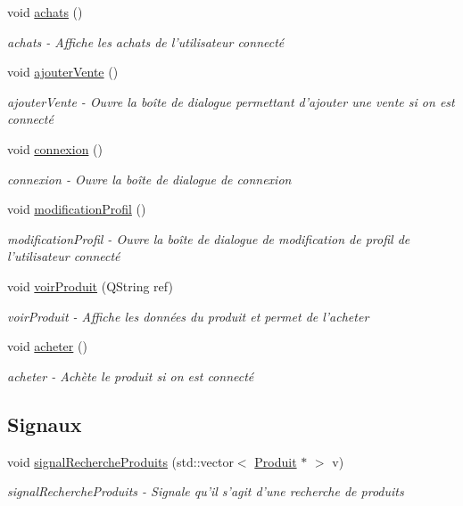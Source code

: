 \begin{DoxyCompactItemize}
void \hyperlink{class_ma_fenetre_a48f619e7d913b0e969273be7435b9ab5}{achats} ()
\begin{DoxyCompactList}\small\item\em achats -\/ Affiche les achats de l'utilisateur connecté \end{DoxyCompactList}\item 
void \hyperlink{class_ma_fenetre_abd8cb1d6b536873f3d369457073270c4}{ajouter\-Vente} ()
\begin{DoxyCompactList}\small\item\em ajouter\-Vente -\/ Ouvre la boîte de dialogue permettant d'ajouter une vente si on est connecté \end{DoxyCompactList}\item 
void \hyperlink{class_ma_fenetre_a65270bfc0eeecb1003c6abc9a1199f32}{connexion} ()
\begin{DoxyCompactList}\small\item\em connexion -\/ Ouvre la boîte de dialogue de connexion \end{DoxyCompactList}\item 
void \hyperlink{class_ma_fenetre_a4568c5e0376f04b9d1ab6c54b9f7c7ed}{modification\-Profil} ()
\begin{DoxyCompactList}\small\item\em modification\-Profil -\/ Ouvre la boîte de dialogue de modification de profil de l'utilisateur connecté \end{DoxyCompactList}\item 
void \hyperlink{class_ma_fenetre_ade3a46e2b308936d934503a88275495a}{voir\-Produit} (Q\-String ref)
\begin{DoxyCompactList}\small\item\em voir\-Produit -\/ Affiche les données du produit et permet de l'acheter \end{DoxyCompactList}\item 
void \hyperlink{class_ma_fenetre_a44eae809341ad4816d8ca151d9b703fb}{acheter} ()
\begin{DoxyCompactList}\small\item\em acheter -\/ Achète le produit si on est connecté \end{DoxyCompactList}\end{DoxyCompactItemize}
\subsection*{Signaux}
\begin{DoxyCompactItemize}
\item 
void \hyperlink{class_ma_fenetre_a75cd895beb38fe68a4319eb6c37ac8ee}{signal\-Recherche\-Produits} (std\-::vector$<$ \hyperlink{class_produit}{Produit} $\ast$ $>$ v)
\begin{DoxyCompactList}\small\item\em signal\-Recherche\-Produits -\/ Signale qu'il s'agit d'une recherche de produits \end{DoxyCompactList}\end{DoxyCompactItemize}
